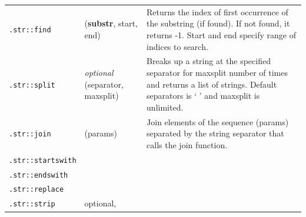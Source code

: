{\begin{table}[t]
\begin{tabular}{l p{3cm} p{6cm}}
            \lstinline{.str::find}       &   (\textbf{substr}, start, end)            & Returns the index of first occurrence of the substring (if found). If not found, it returns -1. Start and end specify range of indices to search.                                                                                                                       \\
            \lstinline{.str::split}      & \emph{optional} (separator, maxsplit) & Breaks up a string at the specified separator for maxsplit number of times and returns a list of strings. Default separators is ` ' and maxsplit is unlimited.                                                                                                          \\
            \lstinline{.str::join}                                & (params)                                                                                                                                                       & Join elements of the sequence (params) separated by the string separator that calls the join function. \\
            \lstinline{.str::startswith}                          &                                                                                                                                                                &                                                                                                        \\
            \lstinline{.str::endswith}                            &                                                                                                                                                                &                                                                                                        \\
            \lstinline{.str::replace}                             &                                                                                                                                                                &                                                                                                        \\
            \lstinline{.str::strip}                               & optional,                                                                                                                                                      &                                                                                                        \\

\end{tabular}
\end{table}}
